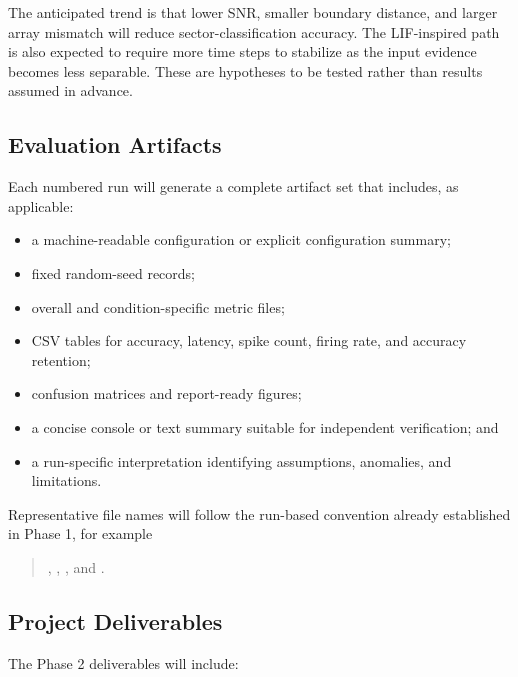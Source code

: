 The anticipated trend is that lower SNR, smaller boundary distance, and larger array mismatch will reduce sector-classification accuracy. The LIF-inspired path is also expected to require more time steps to stabilize as the input evidence becomes less separable. These are hypotheses to be tested rather than results assumed in advance.

\subsection{Evaluation Artifacts}

Each numbered run will generate a complete artifact set that includes, as applicable:

\begin{itemize}
    \item a machine-readable configuration or explicit configuration summary;
    \item fixed random-seed records;
    \item overall and condition-specific metric files;
    \item CSV tables for accuracy, latency, spike count, firing rate, and accuracy retention;
    \item confusion matrices and report-ready figures;
    \item a concise console or text summary suitable for independent verification; and
    \item a run-specific interpretation identifying assumptions, anomalies, and limitations.
\end{itemize}

Representative file names will follow the run-based convention already established in Phase 1, for example

\begin{quote}
,
,
, and
.
\end{quote}

\subsection{Project Deliverables}

The Phase 2 deliverables will include:

